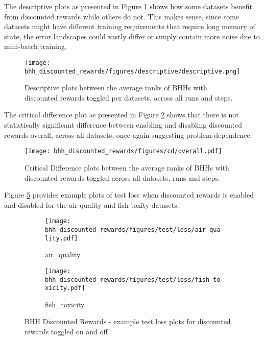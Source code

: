 The descriptive plots as presented in Figure \ref{fig:results:discounted_rewards:descriptive:descriptive} shows how some datasets benefit from discounted rewards while others do not. This makes sense, since some datasets might have different training requirements that require long memory of state, the error landscapes could vastly differ or simply contain more noise due to mini-batch training.

\begin{figure}[htbp]
	\centering
	\texttt{[image: bhh\_discounted\_rewards/figures/descriptive/descriptive.png]}
	\caption{Descriptive plots between the average ranks of \Acsp{BHH} with discounted rewards toggled per datasets, across all runs and steps.}
	\label{fig:results:discounted_rewards:descriptive:descriptive}
\end{figure}

The critical difference plot as presented in Figure \ref{fig:results:discounted_rewards:descriptive:cd} shows that there is not statistically significant difference between enabling and disabling discounted rewards overall, across all datasets, once again suggesting problem-dependence.

\begin{figure}[htbp]
	\centering
	\texttt{[image: bhh\_discounted\_rewards/figures/cd/overall.pdf]}
	\caption{Critical Difference plots between the average ranks of \Acsp{BHH} with discounted rewards toggled across all datasets, runs and steps.}
	\label{fig:results:discounted_rewards:descriptive:cd}
\end{figure}

Figure \ref{fig:results:discounted_rewards:figures:loss} provides example plots of test loss when discounted rewards is enabled and disabled for the air quality and fish toxity datasets.


\begin{figure}[htbp]
	\begin{subfigure}{0.5\textwidth}
		\centering
		\texttt{[image: bhh\_discounted\_rewards/figures/test/loss/air\_quality.pdf]}
		\caption{air\_quality}
		\label{fig:results:discounted_rewards:figures:loss1}
	\end{subfigure}
	\begin{subfigure}{0.5\textwidth}
		\centering
		\texttt{[image: bhh\_discounted\_rewards/figures/test/loss/fish\_toxicity.pdf]}
		\caption{fish\_toxicity}
		\label{fig:results:discounted_rewards:figures:loss2}
	\end{subfigure}
	\caption{\Acs{BHH} Discounted Rewards - example test loss plots for discounted rewards toggled on and off}
	\label{fig:results:discounted_rewards:figures:loss}
\end{figure}

